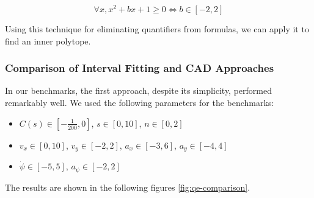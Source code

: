 \[ \forall x, x^2 + bx + 1 \geq 0 \iff b \in [-2, 2] \]

Using this technique for
eliminating quantifiers from formulas, we can apply it to find an inner polytope.

\subsubsection{Comparison of Interval Fitting and CAD Approaches}

In our benchmarks, the first approach, despite its simplicity, performed remarkably well.
We used the following parameters for the benchmarks:
\begin{itemize}
	\item $C(s) \in \left[-\frac{1}{200}, 0\right]$, $s \in [0, 10]$, $n \in [0, 2]$
	\item $v_x \in [0, 10]$, $v_y \in [-2, 2]$, $a_x \in [-3, 6]$, $a_y \in [-4, 4]$
	\item $\dot{\psi} \in [-5, 5]$, $a_\psi \in [-2, 2]$
\end{itemize}

The results are shown in the following figures \ref{fig:qe-comparison}.

